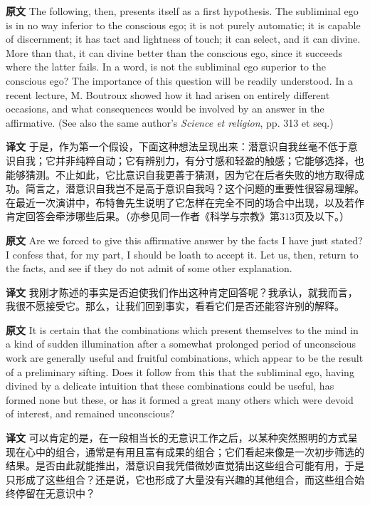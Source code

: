 \documentclass[UTF8]{ctexart}
\newenvironment{english}{\par\small\noindent\textbf{原文}\quad\ignorespaces}{\par}
\newenvironment{zhtranslation}{\par\noindent\textbf{译文}\quad\ignorespaces}{\par\vspace{0.35em}}
\begin{document}
\begin{english}
The following, then, presents itself as a first hypothesis. The subliminal ego is in no way inferior to the conscious ego; it is not purely automatic; it is capable of discernment; it has tact and lightness of touch; it can select, and it can divine. More than that, it can divine better than the conscious ego, since it succeeds where the latter fails. In a word, is not the subliminal ego superior to the conscious ego? The importance of this question will be readily understood. In a recent lecture, M. Boutroux showed how it had arisen on entirely different occasions, and what consequences would be involved by an answer in the affirmative. (See also the same author's \emph{Science et religion}, pp. 313 et seq.)
\end{english}
\begin{zhtranslation}
于是，作为第一个假设，下面这种想法呈现出来：潜意识自我丝毫不低于意识自我；它并非纯粹自动；它有辨别力，有分寸感和轻盈的触感；它能够选择，也能够猜测。不止如此，它比意识自我更善于猜测，因为它在后者失败的地方取得成功。简言之，潜意识自我岂不是高于意识自我吗？这个问题的重要性很容易理解。在最近一次演讲中，布特鲁先生说明了它怎样在完全不同的场合中出现，以及若作肯定回答会牵涉哪些后果。（亦参见同一作者《科学与宗教》第313页及以下。）
\end{zhtranslation}

\begin{english}
Are we forced to give this affirmative answer by the facts I have just stated? I confess that, for my part, I should be loath to accept it. Let us, then, return to the facts, and see if they do not admit of some other explanation.
\end{english}
\begin{zhtranslation}
我刚才陈述的事实是否迫使我们作出这种肯定回答呢？我承认，就我而言，我很不愿接受它。那么，让我们回到事实，看看它们是否还能容许别的解释。\end{zhtranslation}

\begin{english}
It is certain that the combinations which present themselves to the mind in a kind of sudden illumination after a somewhat prolonged period of unconscious work are generally useful and fruitful combinations, which appear to be the result of a preliminary sifting. Does it follow from this that the subliminal ego, having divined by a delicate intuition that these combinations could be useful, has formed none but these, or has it formed a great many others which were devoid of interest, and remained unconscious?
\end{english}
\begin{zhtranslation}
可以肯定的是，在一段相当长的无意识工作之后，以某种突然照明的方式呈现在心中的组合，通常是有用且富有成果的组合；它们看起来像是一次初步筛选的结果。是否由此就能推出，潜意识自我凭借微妙直觉猜出这些组合可能有用，于是只形成了这些组合？还是说，它也形成了大量没有兴趣的其他组合，而这些组合始终停留在无意识中？\end{zhtranslation}
\end{document}
